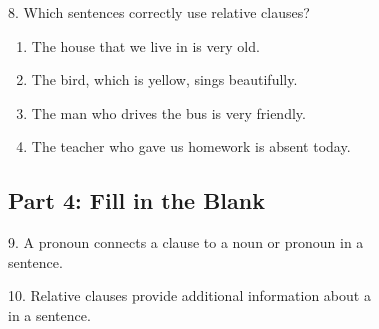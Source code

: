 \documentclass[12pt]{article}
\begin{document}
8. Which sentences correctly use relative clauses?\\
\begin{enumerate}[label=\Alph*.]
    \item The house that we live in is very old.  
    \item The bird, which is yellow, sings beautifully.  
    \item The man who drives the bus is very friendly.  
    \item The teacher who gave us homework is absent today.  
\end{enumerate}

\vspace{1cm}

\subsection*{Part 4: Fill in the Blank}
\vspace{1cm}
9. A \underline{\hspace{4cm}} pronoun connects a clause to a noun or pronoun in a \\sentence.

\vspace{3cm}

10. Relative clauses provide additional information about a \underline{\hspace{4cm}} \\in a sentence.

\vspace{3cm}

\end{document}
